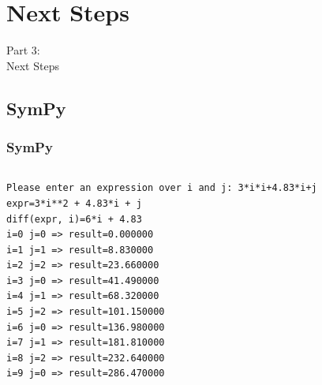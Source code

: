 {
\renewcommand{\bgcolor}{next}

\section{Next Steps}
\begin{frame}
  \vspace{25mm}
  \begin{center}
    \Huge{Part 3:\\Next Steps}
  \end{center}
\end{frame}

\subsection{SymPy}
\begin{frame}[fragile]
  \frametitle{SymPy}
  \vspace{2mm}
  \inputminted[fontsize=\tiny]{python}{../src/sympyexample.py}
  \pause
  \vspace{5mm}
  
  {\tiny
  \begin{verbatim}
Please enter an expression over i and j: 3*i*i+4.83*i+j 
expr=3*i**2 + 4.83*i + j
diff(expr, i)=6*i + 4.83
i=0 j=0 => result=0.000000
i=1 j=1 => result=8.830000
i=2 j=2 => result=23.660000
i=3 j=0 => result=41.490000
i=4 j=1 => result=68.320000
i=5 j=2 => result=101.150000
i=6 j=0 => result=136.980000
i=7 j=1 => result=181.810000
i=8 j=2 => result=232.640000
i=9 j=0 => result=286.470000
  \end{verbatim}
  }
\end{frame}

%    

}
